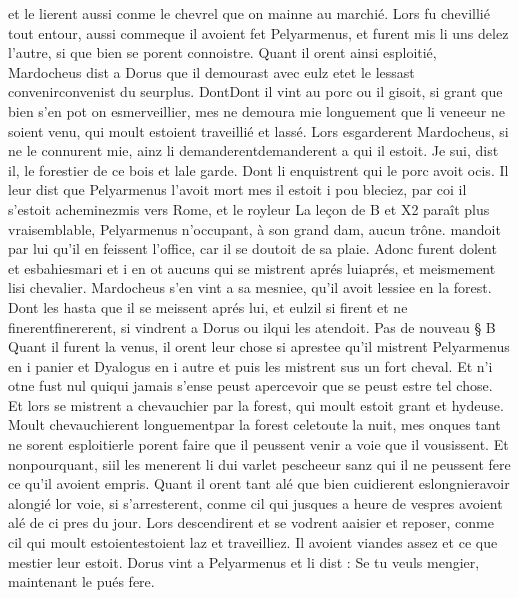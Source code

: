\documentclass{article}
\begin{document}
\begin{pages}
   et le lierent aussi conme le chevrel que on mainne au marchié. Lors fu chevillié tout entour, aussi 
   commeque il avoient fet 
   Pelyarmenus, et furent mis li uns delez l’autre, si que bien se porent connoistre. \pend
\pstart Quant il orent ainsi esploitié, Mardocheus dist a 
   Dorus que il demourast avec eulz 
      etet le 
      lessast convenirconvenist
      du seurplus. DontDont il vint au porc ou il gisoit, 
   si grant que bien s’en pot on esmerveillier, mes ne demoura mie longuement que li veneeur ne soient venu, 
   qui moult estoient traveillié et lassé. Lors esgarderent Mardocheus, si ne le connurent mie, ainz li 
   demanderentdemanderent a 
   qui il estoit.
   Je sui, dist il, le forestier de ce bois et 
      lale garde.
   Dont li enquistrent qui le porc avoit ocis. Il leur dist que 
   Pelyarmenus l’avoit mort mes il estoit i pou bleciez, 
      par coi il s’estoit acheminezmis vers 
      Rome, 
   et le royleur 
   La leçon de B et X2 paraît plus vraisemblable, Pelyarmenus n'occupant, à son grand dam, aucun trône.
   mandoit par lui qu’il en feissent l’office, car il se doutoit de sa plaie. 
   Adonc furent dolent et esbahiesmari 
   et i en ot aucuns qui se mistrent 
   aprés luiaprés, et meismement 
   lisi chevalier. 
   Mardocheus s’en vint a sa mesniee, qu’il avoit lessiee en 
   la forest. 
   Dont les hasta que il se meissent aprés lui, et eulzil si firent 
   et ne finerentfinererent, 
   si vindrent a Dorus ou ilqui les atendoit. \pend
\pstart Pas de nouveau § B
   Quant il furent la venus, il orent leur chose si aprestee qu’il mistrent 
   Pelyarmenus en i panier et Dyalogus en 
   i autre et puis les mistrent sus un fort cheval. Et n’i otne fust 
   nul quiqui jamais 
   s’ense peust apercevoir que se peust estre 
   tel chose. 
   Et lors se mistrent a chevauchier par 
   la forest, qui moult estoit grant et hydeuse. 
   Moult chevauchierent longuementpar la forest 
   celetoute la nuit, mes onques tant ne 
   sorent esploitierle porent faire que il peussent venir a voie 
   que il vousissent. Et nonpourquant, siil les menerent 
   li dui varlet pescheeur sanz qui il ne peussent fere ce qu’il avoient empris. 
   Quant il orent tant alé que bien cuidierent eslongnieravoir alongié lor voie, 
   si s’arresterent, conme cil qui jusques a heure de vespres avoient alé de ci pres du jour. Lors descendirent et se vodrent aaisier et 
   reposer, conme cil qui moult estoientestoient laz et traveilliez. 
   Il avoient viandes assez et ce que mestier leur estoit. Dorus vint a
   Pelyarmenus et li dist :
   Se tu veuls mengier, maintenant le pués fere. 

\end{pages}
\end{document}
